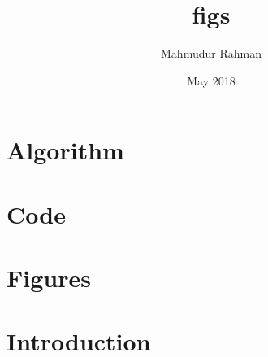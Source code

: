 \documentclass{article}
\title{figs}
\author{Mahmudur Rahman}
\date{May 2018}
\begin{document}
\maketitle

\section{Algorithm}


\section{Code}


\section{Figures}


\section{Introduction}

\end{document}
